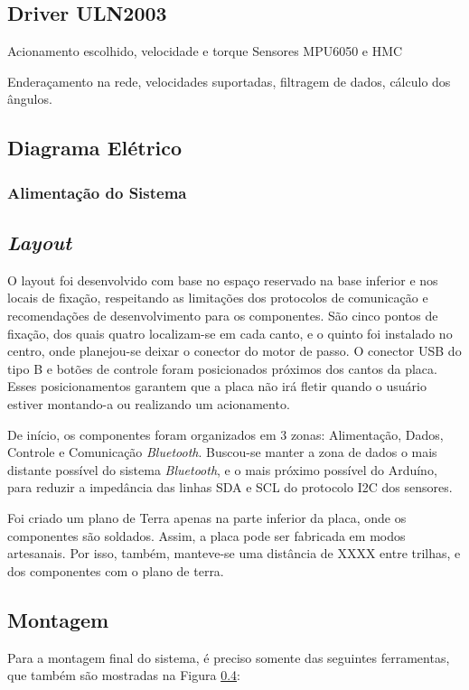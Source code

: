 \subsection{Driver ULN2003}
Acionamento escolhido, velocidade e torque
Sensores MPU6050 e HMC

Enderaçamento na rede, velocidades suportadas, filtragem de dados, cálculo dos ângulos.

\subsection{Diagrama Elétrico}

\subsubsection{Alimentação do Sistema}


\subsection{\textit{Layout}}
O layout foi desenvolvido com base no espaço reservado na base inferior e nos locais de fixação, respeitando as limitações dos protocolos de comunicação e recomendações de desenvolvimento para os componentes. São cinco pontos de fixação, dos quais quatro localizam-se em cada canto, e o quinto foi instalado no centro, onde planejou-se deixar o conector do motor de passo. O conector USB do tipo B e botões de controle foram posicionados próximos dos cantos da placa. Esses posicionamentos garantem que a placa não irá fletir quando o usuário estiver montando-a ou realizando um acionamento. 

De início, os componentes foram organizados em 3 zonas: Alimentação, Dados, Controle e Comunicação \textit{Bluetooth}. Buscou-se manter a zona de dados o mais distante possível do sistema \textit{Bluetooth}, e o mais próximo possível do Arduíno, para reduzir a impedância das linhas SDA e SCL do protocolo I2C dos sensores.  

Foi criado um plano de Terra apenas na parte inferior da placa, onde os componentes são soldados. Assim, a placa pode ser fabricada em modos artesanais. Por isso, também, manteve-se uma distância de XXXX entre trilhas, e dos componentes com o plano de terra. 


\subsection{Montagem}
Para a montagem final do sistema, é preciso somente das seguintes ferramentas, que também são mostradas na Figura \ref{}:

